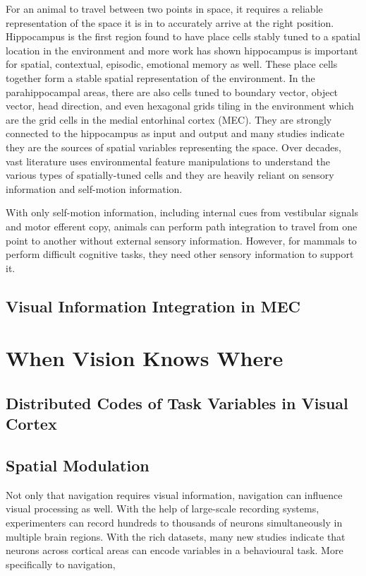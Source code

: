 For an animal to travel between two points in space, it requires a reliable representation of the space it is in to accurately arrive at the right position. Hippocampus is the first region found to have place cells stably tuned to a spatial location in the environment and more work has shown hippocampus is important for spatial, contextual, episodic, emotional memory as well. These place cells together form a stable spatial representation of the environment. In the parahippocampal areas, there are also cells tuned to boundary vector, object vector, head direction, and even hexagonal grids tiling in the environment which are the grid cells in the medial entorhinal cortex (MEC). They are strongly connected to the hippocampus as input and output and many studies indicate they are the sources of spatial variables representing the space. Over decades, vast literature uses environmental feature manipulations to understand the various types of spatially-tuned cells and they are heavily reliant on sensory information and self-motion information.

With only self-motion information, including internal cues from vestibular signals and motor efferent copy, animals can perform path integration to travel from one point to another without external sensory information. However, for mammals to perform difficult cognitive tasks, they need other sensory information to support it. 
\subsection{Visual Information Integration in MEC}



\section{When Vision Knows Where}
\subsection{Distributed Codes of Task Variables in Visual Cortex}



\subsection{Spatial Modulation}
Not only that navigation requires visual information, navigation can influence visual processing as well. With the help of large-scale recording systems, experimenters can record hundreds to thousands of neurons simultaneously in multiple brain regions. With the rich datasets, many new studies indicate that neurons across cortical areas can encode variables in a behavioural task. More specifically to navigation, \cite{saleem_coherent_2018} \cite{mika_diamanti_spatial_2021}

